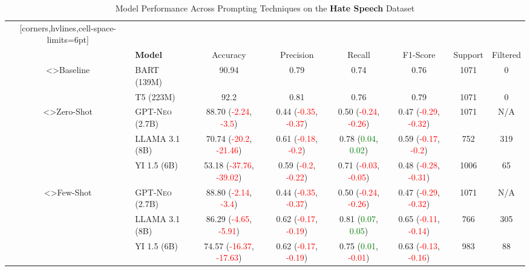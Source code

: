 \documentclass[twocolumn]{article}
\begin{document}
\begin{table}
\centering
\caption{Model Performance Across Prompting Techniques on the \textbf{Hate Speech} Dataset}
\vspace{10pt}
\label{tab:model_performance_hate_speech}
\begin{NiceTabular}{cl*{6}{c}}[corners,hvlines,cell-space-limits=6pt]
    &   
        &  \\
    & \textbf{Model}  
        & Accuracy & Precision & Recall & F1-Score & Support & Filtered \\

<\rotate>{Baseline}
	 & \textsc{BART (139M)} & 90.94 & 0.79 & 0.74 & 0.76 & 1071 & 0 \\
	 & \textsc{T5 (223M)} & 92.2 & 0.81 & 0.76 & 0.79 & 1071 & 0 \\

<\rotate>{Zero-Shot}
	 & \textsc{GPT-Neo (2.7B)} & 88.70 (\textcolor{Red}{-2.24}, \textcolor{Red}{-3.5}) & 0.44 (\textcolor{Red}{-0.35}, \textcolor{Red}{-0.37}) & 0.50 (\textcolor{Red}{-0.24}, \textcolor{Red}{-0.26}) & 0.47 (\textcolor{Red}{-0.29}, \textcolor{Red}{-0.32}) & 1071 & N/A \\
	 & \textsc{LLAMA 3.1 (8B)} & 70.74 (\textcolor{Red}{-20.2}, \textcolor{Red}{-21.46}) & 0.61 (\textcolor{Red}{-0.18}, \textcolor{Red}{-0.2}) & 0.78 (\textcolor{Green}{0.04}, \textcolor{Green}{0.02}) & 0.59 (\textcolor{Red}{-0.17}, \textcolor{Red}{-0.2}) & 752 & 319 \\
	 & \textsc{YI 1.5 (6B)} & 53.18 (\textcolor{Red}{-37.76}, \textcolor{Red}{-39.02}) & 0.59 (\textcolor{Red}{-0.2}, \textcolor{Red}{-0.22}) & 0.71 (\textcolor{Red}{-0.03}, \textcolor{Red}{-0.05}) & 0.48 (\textcolor{Red}{-0.28}, \textcolor{Red}{-0.31}) & 1006 & 65 \\

<\rotate>{Few-Shot}
	 & \textsc{GPT-Neo (2.7B)} & 88.80 (\textcolor{Red}{-2.14}, \textcolor{Red}{-3.4}) & 0.44 (\textcolor{Red}{-0.35}, \textcolor{Red}{-0.37}) & 0.50 (\textcolor{Red}{-0.24}, \textcolor{Red}{-0.26}) & 0.47 (\textcolor{Red}{-0.29}, \textcolor{Red}{-0.32}) & 1071 & N/A \\
	 & \textsc{LLAMA 3.1 (8B)} & 86.29 (\textcolor{Red}{-4.65}, \textcolor{Red}{-5.91}) & 0.62 (\textcolor{Red}{-0.17}, \textcolor{Red}{-0.19}) & 0.81 (\textcolor{Green}{0.07}, \textcolor{Green}{0.05}) & 0.65 (\textcolor{Red}{-0.11}, \textcolor{Red}{-0.14}) & 766 & 305 \\
	 & \textsc{YI 1.5 (6B)} & 74.57 (\textcolor{Red}{-16.37}, \textcolor{Red}{-17.63}) & 0.62 (\textcolor{Red}{-0.17}, \textcolor{Red}{-0.19}) & 0.75 (\textcolor{Green}{0.01}, \textcolor{Red}{-0.01}) & 0.63 (\textcolor{Red}{-0.13}, \textcolor{Red}{-0.16}) & 983 & 88 \\


\end{NiceTabular}
\end{table}
\end{document}
